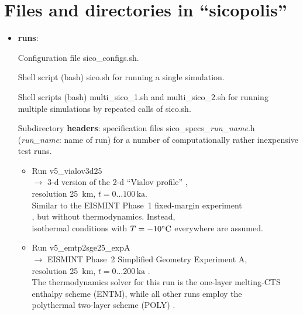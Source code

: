 \documentclass[12pt,a4paper]{article}
\begin{document}



\section{Files and directories in ``sicopolis''}

\begin{itemize}

\item \textbf{runs}:

Configuration file sico\_configs.sh.

Shell script (bash) sico.sh for running a single simulation.

Shell scripts (bash) multi\_sico\_1.sh and multi\_sico\_2.sh for running multiple simulations by repeated calls of sico.sh.

Subdirectory \textbf{headers}: specification files sico\_specs\_\emph{run\_name}.h (\emph{run\_name}: name of run) for a number of computationally rather inexpensive test runs.

\begin{itemize}

\item
Run v5\_vialov3d25
\\
$\longrightarrow$ 3-d version of the 2-d ``Vialov profile'' \citep{vialov_1958},
\\
\phantom{$\longrightarrow$} resolution 25~km, $t=0\ldots{}100\,\mathrm{ka}$.
\\
\phantom{$\longrightarrow$} Similar to the EISMINT Phase~1 fixed-margin experiment
\\
\phantom{$\longrightarrow$} \citep{huybrechts_etal_1996}, but without thermodynamics. Instead,
\\
\phantom{$\longrightarrow$} isothermal conditions with $T=-10^\circ\mathrm{C}$ everywhere are assumed.

\item
Run v5\_emtp2sge25\_expA
\\
$\longrightarrow$ EISMINT Phase~2 Simplified Geometry Experiment A,
\\
\phantom{$\longrightarrow$} resolution 25~km, $t=0\ldots{}200\,\mathrm{ka}$ \citep{payne_etal_2000}.
\\
\phantom{$\longrightarrow$} The thermodynamics solver for this run is the one-layer melting-CTS
\\
\phantom{$\longrightarrow$} enthalpy scheme (ENTM), while all other runs employ the 
\\
\phantom{$\longrightarrow$} polythermal two-layer scheme (POLY) \citep{greve_blatter_2016}.


\end{itemize}
\end{itemize}
\end{document}
